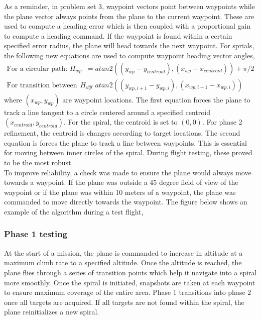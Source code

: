 \documentclass[11pt]{article}
\begin{document}
	As a reminder, in problem set 3, waypoint vectors point between waypoints while the plane vector always points from the plane to the current waypoint. These are used to compute a heading error which is then coupled with a proportional gain to compute a heading command. If the waypoint is found within a certain specified error radius, the plane will head towards the next waypoint. For sprials, the following new equations are used to compute waypoint heading vector angles,
	\begin{align*}
		\mbox{For a circular path: } H_{wp} &= atan2((y_{wp}-y_{centroid}),(x_{wp}-x_{centroid})) + \pi /2 \\
		\mbox{For transition between spirals: } H_{wp} &= atan2((y_{wp,i+1}-y_{wp,i}),(x_{wp,i+1}-x_{wp,i}))
	\end{align*}
	where $(x_{wp},y_{wp})$ are waypoint locations. The first equation forces the plane to track a line tangent to a circle centered around a specified centroid $(x_{centroid},y_{centroid})$. For the spiral, the centroid is set to $(0,0)$. For phase 2 refinement, the centroid is changes according to target locations. The second equation is forces the plane to track a line between waypoints. This is essential for moving between inner circles of the spiral. During flight testing, these proved to be the most robust.\\

	To improve reliability, a check was made to ensure the plane would always move towards a waypoint. If the plane was outside a 45 degree field of view of the waypoint or if the plane was within 10 meters of a waypoint, the plane was commanded to move directly towards the waypoint. The figure below shows an example of the algorithm during a test flight,

	\subsubsection{Phase 1 testing}
	At the start of a mission, the plane is commanded to increase in altitude at a maximum climb rate to a specified altitude. Once the altitude is reached, the plane flies through a series of transition points which help it navigate into a spiral more smoothly. Once the spiral is initiated, snapshots are taken at each waypoint to ensure maximum coverage of the entire area. Phase 1 transitions into phase 2 once all targets are acquired. If all targets are not found within the spiral, the plane reinitializes a new spiral.\\
\end{document}
